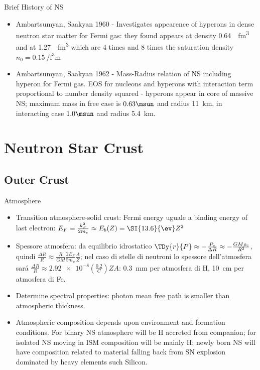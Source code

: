 \begin{frame}{Brief History of NS}
\begin{itemize}
        \item Ambartsumyan, Saakyan 1960 - Investigates appearence of hyperons in dense neutron star matter for Fermi gas: they found \PSigmaminus appears at density \SI{0.64}{\per\cubic\femto\meter} and \PLambda at \SI{1.27}{\per\cubic\femto\meter} which are 4 times and 8 times the saturation density $n_0=\SI{0.15}{\per\cubic\femto\meter}$
        \item Ambartsumyan, Saakyan 1962 - Mass-Radius relation of NS including hyperon for Fermi gas. EOS for nucleons and hyperons with interaction term proportional to number density squared - hyperons appear in core of massive NS; maximum mass in free case is $0.63\msun$ and radius \SI{11}{\kilo\meter}, in interacting case $1.0\msun$ and radius \SI{5.4}{\kilo\meter}.
\end{itemize}
\end{frame}

\section{Neutron Star Crust}

\subsection{Outer Crust}

\begin{frame}{Atmosphere}
    \begin{itemize}
        \item Transition atmosphere-solid crust: Fermi energy uguale a binding energy of last electron: $E_F=\frac{k_F^2}{2m_e}\approx E_b(Z)=\SI{13.6}{\ev}Z^2$
        \item Spessore atmosfera: da equilibrio idrostatico $\TDy{r}{P}\approx-\frac{P_c}{\Delta R}\approx-\frac{GM\rho_c}{R^2}$, quindi $\frac{\Delta R}{R}\approx \frac{R}{GM}\frac{2E_F}{5m_u}\frac{A}{Z}$; nel caso di stelle di neutroni lo spessore dell'atmosfera sar\'a $\frac{\Delta R}{R}\approx\SI{2.92e-8}(\frac{0.2}{C})ZA$: \SI{0.3}{\milli\meter} per atmosfera di H, \SI{10}{\cm} per atmosfera di Fe.
        \item Determine spectral properties: photon mean free path is smaller than atmospheric thickness.
        \item Atmospheric composition depends upon environment and formation conditions. For binary NS atmosphere will be H accreted from companion; for isolated NS moving in ISM composition will be mainly H; newly born NS will have composition related to material falling back from SN explosion dominated by heavy elements such Silicon.
    \end{itemize}
\end{frame}

